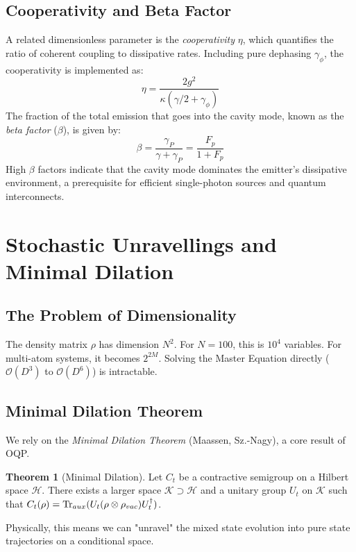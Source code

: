 \documentclass[11pt,a4paper]{article}
\theoremstyle{definition}
\newtheorem{theorem}{Theorem}[section]
\begin{document}
\subsection{Cooperativity and Beta Factor}
A related dimensionless parameter is the \emph{cooperativity} $\eta$, which quantifies the ratio of coherent coupling to dissipative rates. Including pure dephasing $\gamma_\phi$, the cooperativity is implemented as:
\begin{equation}
    \eta = \frac{2g^2}{\kappa (\gamma/2 + \gamma_\phi)}
\end{equation}
The fraction of the total emission that goes into the cavity mode, known as the \emph{beta factor} ($\beta$), is given by:
\begin{equation}
    \beta = \frac{\gamma_P}{\gamma + \gamma_P} = \frac{F_p}{1 + F_p}
\end{equation}
High $\beta$ factors indicate that the cavity mode dominates the emitter's dissipative environment, a prerequisite for efficient single-photon sources and quantum interconnects.

\section{Stochastic Unravellings and Minimal Dilation}
\label{sec:dilation}

\subsection{The Problem of Dimensionality}
The density matrix $\rho$ has dimension $N^2$. For $N=100$, this is $10^4$ variables. For multi-atom systems, it becomes $2^{2M}$.
Solving the Master Equation directly ($\mathcal{O}(D^3)$ to $\mathcal{O}(D^6)$) is intractable.

\subsection{Minimal Dilation Theorem}
We rely on the \emph{Minimal Dilation Theorem} (Maassen, Sz.-Nagy), a core result of OQP.
\begin{theorem}[Minimal Dilation]
Let $C_t$ be a contractive semigroup on a Hilbert space $\mathcal{H}$. There exists a larger space $\mathcal{K} \supset \mathcal{H}$ and a unitary group $U_t$ on $\mathcal{K}$ such that $C_t(\rho) = \Tr_{aux}(U_t (\rho \otimes \rho_{vac}) U_t^\dagger)$.
\end{theorem}
Physically, this means we can "unravel" the mixed state evolution into pure state trajectories on a conditional space.
\end{document}
